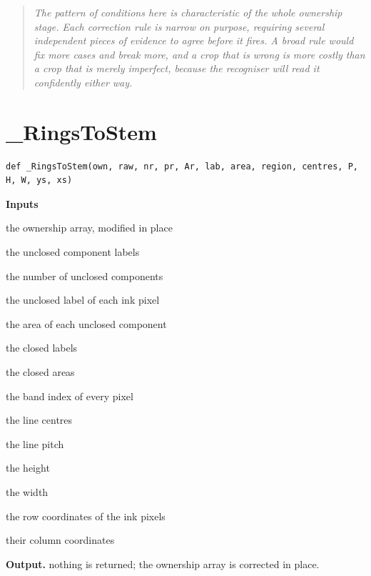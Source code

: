 \begin{quote}\small\itshape The pattern of conditions here is characteristic of the whole ownership stage. Each correction rule is narrow on purpose, requiring several independent pieces of evidence to agree before it fires. A broad rule would fix more cases and break more, and a crop that is wrong is more costly than a crop that is merely imperfect, because the recogniser will read it confidently either way.\end{quote}

\section{\_RingsToStem}
\begin{lstlisting}[style=sig]
def _RingsToStem(own, raw, nr, pr, Ar, lab, area, region, centres, P, H, W, ys, xs)
\end{lstlisting}

\noindent\textbf{Inputs}
\begin{description}[leftmargin=2.2em,style=nextline,font=\normalfont\ttfamily]\setlength\itemsep{1pt}
  \item[{own}] \normalfont the ownership array, modified in place
  \item[{raw}] \normalfont the unclosed component labels
  \item[{nr}] \normalfont the number of unclosed components
  \item[{pr}] \normalfont the unclosed label of each ink pixel
  \item[{Ar}] \normalfont the area of each unclosed component
  \item[{lab}] \normalfont the closed labels
  \item[{area}] \normalfont the closed areas
  \item[{region}] \normalfont the band index of every pixel
  \item[{centres}] \normalfont the line centres
  \item[{P}] \normalfont the line pitch
  \item[{H}] \normalfont the height
  \item[{W}] \normalfont the width
  \item[{ys}] \normalfont the row coordinates of the ink pixels
  \item[{xs}] \normalfont their column coordinates
\end{description}

\noindent\textbf{Output.} nothing is returned; the ownership array is corrected in place.


